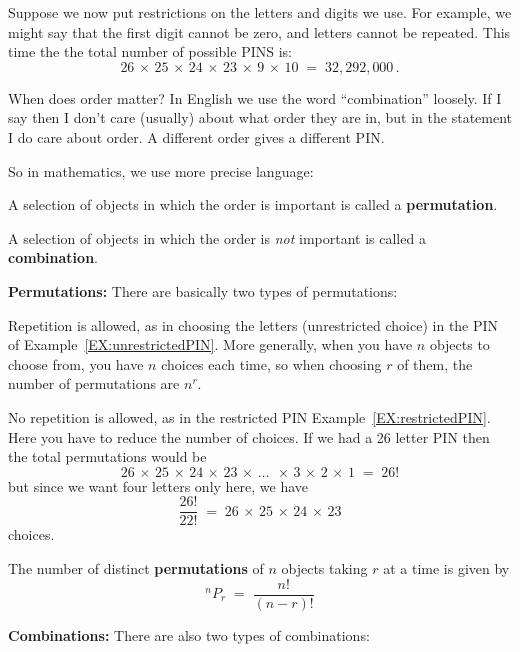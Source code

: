 \begin{example}\label{EX:restrictedPIN}
Suppose we now put restrictions on the letters and digits we use. For example,
we might say that the first digit cannot be zero, and  letters cannot be
repeated.  This time the the total number of possible PINS is:
\[ 26\,\times\,25 \,\times\,24\,\times\,23\,\times\,9\,\times\,10 \;=\;32,292,000\,.\]
\end{example}

When does order matter? In English we use the word ``combination'' loosely.
If I  say
 then I don't care (usually) about what order they are in,
but in the statement
I do care about order. A different order gives a different PIN.

So in mathematics, we use more precise language:
\bit
\item A selection of objects in which the order  is
  important is called a {\bf permutation}.

\item A selection of objects in which the order  is
  \emph{not}
  important is called a {\bf combination}.
\eit

{\bf Permutations:} There are basically two types of permutations:

\be
\item  Repetition is allowed, as in choosing the letters (unrestricted choice) in the PIN of Example~\ref{EX:unrestrictedPIN}.
More generally, when you have $n$ objects to choose from, you have $n$ choices each time, so when choosing $r$ of them, the  number of permutations are $n^r$.
\item  No repetition is allowed, as in the restricted  PIN Example~\ref{EX:restrictedPIN}. Here you have to reduce the number of choices.
If we had a 26 letter PIN then the total permutations would be
\[26\,\times\,25 \,\times\,24\,\times\,23\,\times\,\dots\;\,\times\,3
\,\times\,2 \,\times\, 1\;=\; 26!\]
but since we  want four letters only here,  we  have
\[\frac{26!}{22!}\;=\; 26\,\times\,25 \,\times\,24\,\times\,23\]
choices.
\ee

\begin{framed}The number of distinct {\bf permutations}  of $n$ objects taking
$r$ at a time is given by
\[^nP_r\;=\; \frac{n!}{(n-r)!}\]
\end{framed}

\bigskip

{\bf Combinations:} There are also two types of combinations:


